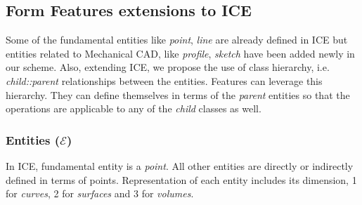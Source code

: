 \subsection{Form Features extensions to ICE}

Some of the fundamental entities like {\em point}, {\em line} are already defined in ICE but entities related to Mechanical CAD, like {\em profile}, {\em sketch} have been added newly in our scheme. Also, extending ICE, we propose the use of class hierarchy, i.e. {\em child::parent} relationships between the entities. Features can leverage this hierarchy.  They can define themselves in terms of the {\em parent} entities so that the operations are  applicable to any of the {\em child} classes as well.


\subsubsection{Entities ($\mathcal{E}$)}
In ICE, fundamental entity is a {\em point}. All other entities are directly or indirectly defined in terms of points. Representation of each entity includes its dimension, 1 for {\em curves}, 2 for {\em surfaces} and 3 for {\em volumes}. 

